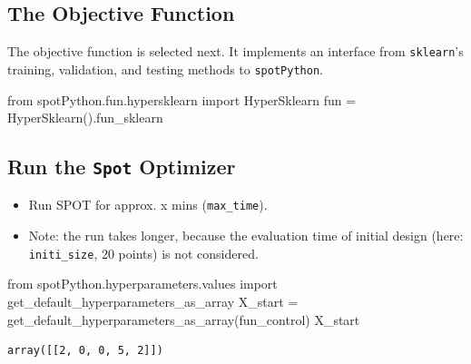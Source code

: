 \documentclass[
  letterpaper,
  DIV=11,
  numbers=noendperiod]{scrreprt}
\newenvironment{Shaded}{\begin{snugshade}}{\end{snugshade}}
\newcommand{\ImportTok}[1]{\textcolor[rgb]{0.00,0.46,0.62}{#1}}
\newcommand{\NormalTok}[1]{\textcolor[rgb]{0.00,0.23,0.31}{#1}}
\newcommand{\OperatorTok}[1]{\textcolor[rgb]{0.37,0.37,0.37}{#1}}
\providecommand{\tightlist}{%
  \setlength{\itemsep}{0pt}\setlength{\parskip}{0pt}}\usepackage{longtable,booktabs,array}
\begin{document}
\hypertarget{sec-the-objective-function-19}{%
\subsection{The Objective
Function}\label{sec-the-objective-function-19}}

The objective function is selected next. It implements an interface from
\texttt{sklearn}'s training, validation, and testing methods to
\texttt{spotPython}.

\begin{Shaded}
\begin{Highlighting}[]
\ImportTok{from}\NormalTok{ spotPython.fun.hypersklearn }\ImportTok{import}\NormalTok{ HyperSklearn}
\NormalTok{fun }\OperatorTok{=}\NormalTok{ HyperSklearn().fun\_sklearn}
\end{Highlighting}
\end{Shaded}

\hypertarget{run-the-spot-optimizer-4}{%
\subsection{\texorpdfstring{Run the \texttt{Spot}
Optimizer}{Run the Spot Optimizer}}\label{run-the-spot-optimizer-4}}

\begin{itemize}
\tightlist
\item
  Run SPOT for approx. x mins (\texttt{max\_time}).
\item
  Note: the run takes longer, because the evaluation time of initial
  design (here: \texttt{initi\_size}, 20 points) is not considered.
\end{itemize}

\begin{Shaded}
\begin{Highlighting}[]
\ImportTok{from}\NormalTok{ spotPython.hyperparameters.values }\ImportTok{import}\NormalTok{ get\_default\_hyperparameters\_as\_array}
\NormalTok{X\_start }\OperatorTok{=}\NormalTok{ get\_default\_hyperparameters\_as\_array(fun\_control)}
\NormalTok{X\_start}
\end{Highlighting}
\end{Shaded}

\begin{verbatim}
array([[2, 0, 0, 5, 2]])
\end{verbatim}
\end{document}
